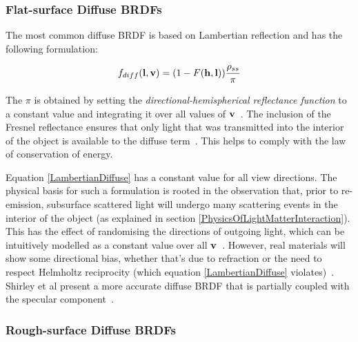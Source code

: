\subsubsection{Flat-surface Diffuse BRDFs}

The most common diffuse BRDF is based on Lambertian reflection and has the following formulation:

\begin{equation} \label{LambertianDiffuse}
	f_{diff}(\mathbf{l}, \mathbf{v}) = (1 - F(\mathbf{h}, \mathbf{l}))\frac{\rho_{ss}}{\pi}
\end{equation}

The \begin{math}\pi\end{math} is obtained by setting the \textit{directional-hemispherical reflectance function} to a constant value and integrating it over all values of \begin{math}\mathbf{v}\end{math}~\cite{RTR4}. The inclusion of the Fresnel reflectance ensures that only light that was transmitted into the interior of the object is available to the diffuse term~\cite{ShirleySimpleConservationOfEnergy}. This helps to comply with the law of conservation of energy.

Equation \ref{LambertianDiffuse} has a constant value for all view directions. The physical basis for such a formulation is rooted in the observation that, prior to re-emission, subsurface scattered light will undergo many scattering events in the interior of the object (as explained in section \ref{PhysicsOfLightMatterInteraction}). This has the effect of randomising the directions of outgoing light, which can be intuitively modelled as a constant value over all \begin{math}\mathbf{v}\end{math}~\cite{HammonBRDF}. However, real materials will show some directional bias, whether that's due to refraction or the need to respect Helmholtz reciprocity (which equation \ref{LambertianDiffuse} violates)~\cite{RTR4}. Shirley et al present a more accurate diffuse BRDF that is partially coupled with the specular component~\cite{PractitionersReflectionModels}.

\subsubsection{Rough-surface Diffuse BRDFs}

